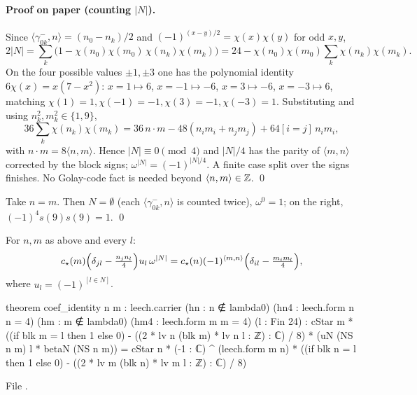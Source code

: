 \paragraph{Proof on paper (counting $|N|$).}  Since $\langle\gamma^-_{0k},n\rangle=(n_0-n_k)/2$ and
$(-1)^{(x-y)/2}=\chi(x)\chi(y)$ for odd $x,y$,
\begin{equation*}
 2|N|=\sum_{k}\bigl(1-\chi(n_0)\chi(m_0)\,\chi(n_k)\chi(m_k)\bigr)=24-\chi(n_0)\chi(m_0)\sum_k\chi(n_k)\chi(m_k).
\end{equation*}
On the four possible values $\pm1,\pm3$ one has the polynomial identity $6\chi(x)=x(7-x^2)$:
$x=1\mapsto6$, $x=-1\mapsto-6$, $x=3\mapsto-6$, $x=-3\mapsto6$, matching $\chi(1)=1,\chi(-1)=-1,\chi(3)=-1,\chi(-3)=1$.
Substituting and using $n_k^2,m_k^2\in\{1,9\}$,
\begin{equation*}
 36\sum_k\chi(n_k)\chi(m_k)=36\,n\cdot m-48(n_im_i+n_jm_j)+64[i=j]\,n_im_i,
\end{equation*}
with $n\cdot m=8\langle n,m\rangle$.  Hence $|N|\equiv0\pmod4$ and $|N|/4$ has the parity of $\langle m,n\rangle$
corrected by the block signs; $\omega^{|N|}=(-1)^{|N|/4}$.  A finite case split over the signs finishes.
No Golay-code fact is needed beyond $\langle n,m\rangle\in{\mathbb{Z}}$. \qed

\begin{example}
Take $n=m$.  Then $N=\emptyset$ (each $\langle\gamma^-_{0k},n\rangle$ is counted twice), $\omega^0=1$; on the right,
$(-1)^{4}s(9)s(9)=1$. \qed
\end{example}

\begin{theorem}\label{ch14:thm:coef}
For $n,m$ as above and every $l$:
\begin{equation*}
 c_\star(m)\Bigl(\delta_{jl}-\tfrac{n_jn_l}{4}\Bigr)u_l\,\omega^{|N|}
 =c_\star(n)(-1)^{\langle m,n\rangle}\Bigl(\delta_{il}-\tfrac{m_im_l}{4}\Bigr),
\end{equation*}
where $u_l=(-1)^{[l\in N]}$.
\end{theorem}
\begin{leancode}
theorem coef_identity {n m : leech.carrier} (hn : n ∉ lambda0) (hn4 : leech.form n n = 4)
    (hm : m ∉ lambda0) (hm4 : leech.form m m = 4) (l : Fin 24) :
    cStar m * ((if blk m = l then 1 else 0) - ((2 * lv n (blk m) * lv n l : ℤ) : ℂ) / 8)
        * (uN (NS n m) l * betaN (NS n m))
      = cStar n * (-1 : ℂ) ^ (leech.form m n)
        * ((if blk n = l then 1 else 0) - ((2 * lv m (blk n) * lv m l : ℤ) : ℂ) / 8)
\end{leancode}
File .


